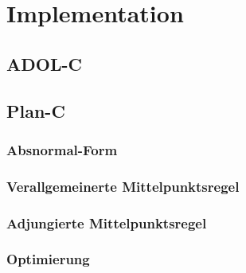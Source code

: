 \chapter{Implementation}
\section{ADOL-C}

\section{Plan-C}
\subsection{Absnormal-Form}

\subsection{Verallgemeinerte Mittelpunktsregel}

\subsection{Adjungierte Mittelpunktsregel}

\subsection{Optimierung}